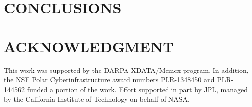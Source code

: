 \documentclass[sigconf]{acmart}
\begin{document}


\maketitle









\section{CONCLUSIONS}

\section*{ACKNOWLEDGMENT}
This work was supported by the DARPA XDATA/Memex program. In addition, the NSF Polar Cyberinfrastructure award numbers PLR-1348450 and PLR-144562 funded a portion of the work. Effort supported in part by JPL, managed by the California Institute of Technology on behalf of NASA.


 
\end{document}
